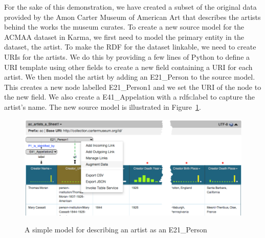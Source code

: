 For the sake of this demonstration, we have created a subset of the original data provided by the Amon Carter Museum of American Art that describes the artists behind the works the museum curates.  
To create a new source model for the ACMAA dataset in Karma, we first need to model the primary entity in the dataset, the artist.  To make the RDF for the dataset linkable, we need to create URIs for the artists.  
We do this by providing a few lines of Python to define a URI template using other fields to create a new field containing a URI for each artist.  We then model the artist by adding an E21\_Person to the source model.  
This creates a new node labelled E21\_Person1 and we set the URI of the node to the new field.  
We also create a E41\_Appelation with a rdfs:label to capture the artist's name.  
The new source model is illustrated in Figure~\ref{fig:simple-model-screenshot}. 


\begin{figure}
\begin{center}
\includegraphics[width=4.8in]{images/4-simple-model.png}
\vspace{-3mm}
\caption{A simple model for describing an artist as an E21\_Person}
\vspace{-2mm}
\label{fig:simple-model-screenshot}
\end{center}
\vspace{-1.5em}
\end{figure}


